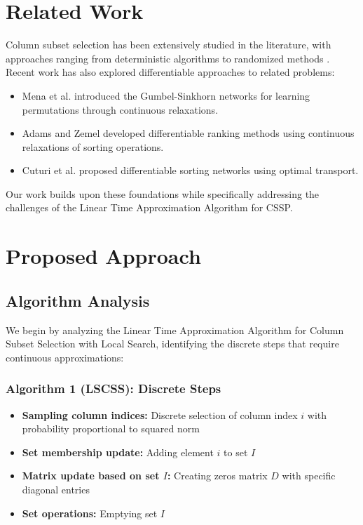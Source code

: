 \documentclass{article}
\begin{document}
\section{Related Work}
Column subset selection has been extensively studied in the literature, with approaches ranging from deterministic algorithms \cite{farahat2013fast} to randomized methods \cite{boutsidis2009improved}. Recent work has also explored differentiable approaches to related problems:

\begin{itemize}
    \item Mena et al. \cite{mena2018learning} introduced the Gumbel-Sinkhorn networks for learning permutations through continuous relaxations.
    \item Adams and Zemel \cite{adams2011ranking} developed differentiable ranking methods using continuous relaxations of sorting operations.
    \item Cuturi et al. \cite{cuturi2019differentiable} proposed differentiable sorting networks using optimal transport.
\end{itemize}

Our work builds upon these foundations while specifically addressing the challenges of the Linear Time Approximation Algorithm for CSSP.

\section{Proposed Approach}

\subsection{Algorithm Analysis}
We begin by analyzing the Linear Time Approximation Algorithm for Column Subset Selection with Local Search, identifying the discrete steps that require continuous approximations:

\subsubsection{Algorithm 1 (LSCSS): Discrete Steps}
\begin{itemize}
    \item \textbf{Sampling column indices:} Discrete selection of column index $i$ with probability proportional to squared norm
    \item \textbf{Set membership update:} Adding element $i$ to set $I$
    \item \textbf{Matrix update based on set $I$:} Creating zeros matrix $D$ with specific diagonal entries
    \item \textbf{Set operations:} Emptying set $I$
\end{itemize}
\end{document}
